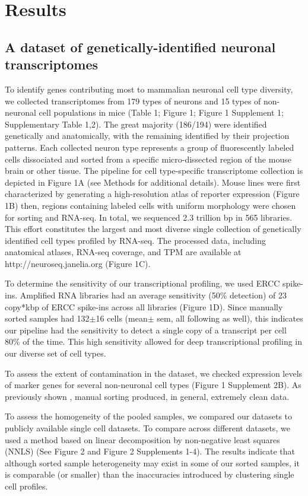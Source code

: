 \section{Results}

\subsection{A dataset of genetically-identified neuronal transcriptomes}
To identify genes contributing most to mammalian neuronal cell type diversity, we collected transcriptomes from 179 types of neurons and 15 types of non-neuronal cell populations in mice (Table 1; Figure 1; Figure 1 Supplement 1; Supplementary Table 1,2). The great majority (186/194) were identified genetically and anatomically, with the remaining identified by their projection patterns. Each collected neuron type represents a group of fluorescently labeled cells dissociated and sorted from a specific micro-dissected region of the mouse brain or other tissue. The pipeline for cell type-specific transcriptome collection is depicted in Figure 1A (see Methods for additional details). Mouse lines were first characterized by generating a high-resolution atlas of reporter expression (Figure 1B) then, regions containing labeled cells with uniform morphology were chosen for sorting and RNA-seq. In total, we sequenced 2.3 trillion bp in 565 libraries. This effort constitutes the largest and most diverse single collection of genetically identified cell types profiled by RNA-seq. The processed data, including anatomical atlases, RNA-seq coverage, and TPM are available at http://neuroseq.janelia.org (Figure 1C).

To determine the sensitivity of our transcriptional profiling, we used ERCC spike-ins. Amplified RNA libraries had an average sensitivity (50\% detection) of 23 copy*kbp of ERCC spike-ins across all libraries (Figure 1D). Since manually sorted samples had 132$\pm$16 cells (mean$\pm$ sem, all following as well), this indicates our pipeline had the sensitivity to detect a single copy of a transcript per cell 80\% of the time. This high sensitivity allowed for deep transcriptional profiling in our diverse set of cell types.

To assess the extent of contamination in the dataset, we checked expression levels of marker genes for several non-neuronal cell types (Figure 1 Supplement 2B). As previously shown \citep{Okaty_2011}, manual sorting produced, in general, extremely clean data.

To assess the homogeneity of the pooled samples, we compared our datasets to publicly available single cell datasets. To compare across different datasets, we used a method based on linear decomposition by non-negative least squares (NNLS) (See Figure 2 and Figure 2 Supplements 1-4). The results indicate that although sorted sample heterogeneity may exist in some of our sorted samples, it is comparable (or smaller) than the inaccuracies introduced by clustering single cell profiles.

